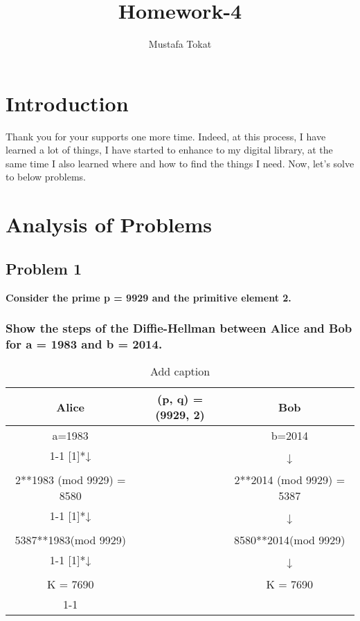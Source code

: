 \documentclass[11pt]{article}
\begin{document}
\title{Homework-4}
\author{Mustafa Tokat}
\maketitle
\section{Introduction}

Thank you for your supports one more time. Indeed, at this process, I have learned a lot of things,
I have started to enhance to my digital library, at the same time I also learned where and how to find 
the things I need. Now, let's solve to below problems.
\section{Analysis of Problems}
\subsection{Problem 1} \textbf{Consider the prime p = 9929 and the primitive element 2.}
\subsubsection{\textbf{Show the steps of the Diffie-Hellman between Alice and Bob for a = 1983 and b = 2014.}}
\begin{table}[htbp]
    \centering
    \caption{Add caption}
      \begin{tabular}{ccc}
      \toprule
      Alice & (p, q) = (9929, 2) & Bob \\
      \midrule
      a=1983 &       & b=2014 \\
  \cmidrule{1-1}\cmidrule{3-3}    \multirow{2}[1]{*}{↓} &       & \multirow{2}[1]{*}{↓} \\
            &       &  \\
      \multicolumn{1}{c}{\multirow{2}[1]{*}{2**1983 (mod 9929)                                       = 8580}} &       & \multicolumn{1}{c}{\multirow{2}[1]{*}{2**2014 (mod 9929)              = 5387}} \\
            &       &  \\
  \cmidrule{1-1}\cmidrule{3-3}    \multirow{2}[1]{*}{↓} &       & \multirow{2}[1]{*}{↓} \\
            &       &  \\
      5387**1983(mod 9929) &       & 8580**2014(mod 9929) \\
  \cmidrule{1-1}\cmidrule{3-3}    \multirow{2}[1]{*}{↓} &       & \multirow{2}[1]{*}{↓} \\
            &       &  \\
      K = 7690 &       & K = 7690 \\
  \cmidrule{1-1}\cmidrule{3-3}    \end{tabular}%
    \label{tab:addlabel}%
  \end{table}%
  
\end{document}
